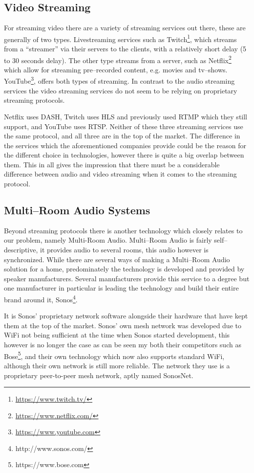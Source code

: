 \subsection{Video Streaming}
For streaming video there are a variety of streaming services out there, these are generally of two types.
Livestreaming services such as Twitch\footnote{\url{https://www.twitch.tv/}}, which streams from a ``streamer'' via their servers to the clients, with a relatively short delay (5 to 30 seconds delay).
The other type streams from a server, such as Netflix\footnote{\url{https://www.netflix.com/}} which allow for streaming pre--recorded content, e.g. movies and tv--shows.
YouTube\footnote{\url{https://www.youtube.com}}, offers both types of streaming.
In contrast to the audio streaming services the video streaming services do not seem to be relying on proprietary streaming protocols.

Netflix uses \ac{DASH}, Twitch uses \ac{HLS} and previously used \ac{RTMP} which they still support, and YouTube uses \ac{RTSP}.\cite{netflix}\cite{twitch}\cite{youtube}
Neither of these three streaming services use the same protocol, and all three are in the top of the market.
The difference in the services which the aforementioned companies provide could be the reason for the different choice in technologies, however there is quite a big overlap between them. 
This in all gives the impression that there must be a considerable difference between audio and video streaming when it comes to the streaming protocol.

\subsection{Multi--Room Audio Systems}
Beyond streaming protocols there is another technology which closely relates to our problem, namely Multi-Room Audio.
Multi--Room Audio is fairly self--descriptive, it provides audio to several rooms, this audio however is synchronized.
While there are several ways of making a Multi--Room Audio solution for a home, predominately the technology is developed and provided by speaker manufacturers.
Several manufacturers provide this service to a degree but one manufacturer in particular is leading the technology and build their entire brand around it, Sonos\footnote{http://www.sonos.com/}.

It is Sonos' proprietary network software alongside their hardware that have kept them at the top of the market.
Sonos' own mesh network was developed due to WiFi not being sufficient at the time when Sonos started development, this however is no longer the case as can be seen my both their competitors such as Bose\footnote{https://www.bose.com}, and their own technology which now also supports standard WiFi, although their own network is still more reliable.\cite{sonos1} %
The network they use is a proprietary peer-to-peer mesh network, aptly named SonosNet.\cite{sonosWiki} %

